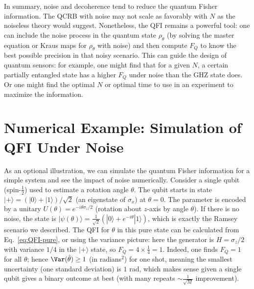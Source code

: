 In summary, noise and decoherence tend to reduce the quantum Fisher
information. The QCRB with noise may not scale as favorably with $N$
as the noiseless theory would suggest. Nonetheless, the QFI remains a
powerful tool: one can include the noise process in the quantum state
$\rho_\theta$ (by solving the master equation or Kraus maps for
$\rho_\theta$ with noise) and then compute $F_Q$ to know the best
possible precision in that noisy scenario. This can guide the design
of quantum sensors: for example, one might find that for a given $N$,
a certain partially entangled state has a higher $F_Q$ under noise
than the GHZ state does. Or one might find the optimal $N$ or optimal
time to use in an experiment to maximize the information.



\section{Numerical Example: Simulation of QFI Under Noise}

\label{sec:numerics}



As an optional illustration, we can simulate the quantum Fisher
information for a simple system and see the impact of noise
numerically. Consider a single qubit (spin-$\frac{1}{2}$) used to
estimate a rotation angle $\theta$. The qubit starts in state
$|+\rangle = (|0\rangle+|1\rangle)/\sqrt{2}$ (an eigenstate of
$\sigma_x$) at $\theta=0$. The parameter is encoded by a unitary
$U(\theta) = e^{-i \theta \sigma_z/2}$ (rotation about $z$-axis by
angle $\theta$). If there is no noise, the state is
$|\psi(\theta)\rangle = \frac{1}{\sqrt{2}}(|0\rangle +
e^{-i\theta}|1\rangle)$, which is exactly the Ramsey scenario we
described. The QFI for $\theta$ in this pure state can be calculated
from Eq.~\eqref{eq:QFI-pure}, or using the variance picture: here the
generator is $H=\sigma_z/2$ with variance $1/4$ in the $|+\rangle$
state, so $F_Q = 4 \times \frac{1}{4} = 1$. Indeed, one finds $F_Q =
1$ for all $\theta$; hence $\Var(\hat{\theta}) \ge 1$ (in radians$^2$)
for one shot, meaning the smallest uncertainty (one standard
deviation) is $1$ rad, which makes sense given a single qubit gives a
binary outcome at best (with many repeats $\sim \frac{1}{\sqrt{M}}$
improvement).



